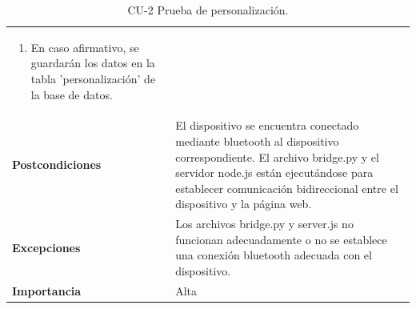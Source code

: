 \begin{table}[p]
\begin{tabularx}{\linewidth}{ p{} p{} }
\begin{enumerate}
        \item En caso afirmativo, se guardarán los datos en la tabla 'personalización' de la base de datos.
		\end{enumerate}\\
		\textbf{Postcondiciones}        & 		El dispositivo se encuentra conectado mediante bluetooth al dispositivo correspondiente. El archivo bridge.py y el servidor node.js están ejecutándose para establecer comunicación bidireccional entre el dispositivo y la página web. %
  \\
		\textbf{Excepciones}          & Los archivos bridge.py y server.js no funcionan adecuadamente o no se establece una conexión bluetooth adecuada con el dispositivo. \\
		\textbf{Importancia}          & Alta \\
		\bottomrule
	\end{tabularx}
	\caption{CU-2 Prueba de personalización.}
        \label{tab:CU-2}
\end{table}

